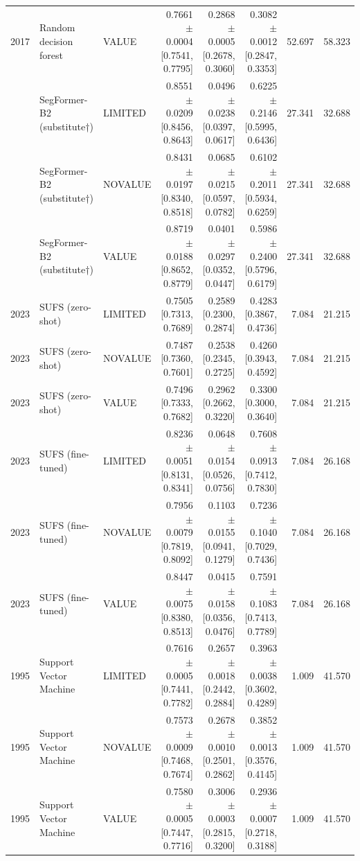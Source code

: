 \begin{table}[t]
\begin{tabular}{lllrrrrr}
2017 & Random decision forest & VALUE & 0.7661 $\pm$ 0.0004 [0.7541, 0.7795] & 0.2868 $\pm$ 0.0005 [0.2678, 0.3060] & 0.3082 $\pm$ 0.0012 [0.2847, 0.3353] & 52.697 & 58.323 \\
 & SegFormer-B2 (substitute†) & LIMITED & 0.8551 $\pm$ 0.0209 [0.8456, 0.8643] & 0.0496 $\pm$ 0.0238 [0.0397, 0.0617] & 0.6225 $\pm$ 0.2146 [0.5995, 0.6436] & 27.341 & 32.688 \\
 & SegFormer-B2 (substitute†) & NOVALUE & 0.8431 $\pm$ 0.0197 [0.8340, 0.8518] & 0.0685 $\pm$ 0.0215 [0.0597, 0.0782] & 0.6102 $\pm$ 0.2011 [0.5934, 0.6259] & 27.341 & 32.688 \\
 & SegFormer-B2 (substitute†) & VALUE & 0.8719 $\pm$ 0.0188 [0.8652, 0.8779] & 0.0401 $\pm$ 0.0297 [0.0352, 0.0447] & 0.5986 $\pm$ 0.2400 [0.5796, 0.6179] & 27.341 & 32.688 \\
2023 & SUFS (zero-shot) & LIMITED & 0.7505 [0.7313, 0.7689] & 0.2589 [0.2300, 0.2874] & 0.4283 [0.3867, 0.4736] & 7.084 & 21.215 \\
2023 & SUFS (zero-shot) & NOVALUE & 0.7487 [0.7360, 0.7601] & 0.2538 [0.2345, 0.2725] & 0.4260 [0.3943, 0.4592] & 7.084 & 21.215 \\
2023 & SUFS (zero-shot) & VALUE & 0.7496 [0.7333, 0.7682] & 0.2962 [0.2662, 0.3220] & 0.3300 [0.3000, 0.3640] & 7.084 & 21.215 \\
2023 & SUFS (fine-tuned) & LIMITED & 0.8236 $\pm$ 0.0051 [0.8131, 0.8341] & 0.0648 $\pm$ 0.0154 [0.0526, 0.0756] & 0.7608 $\pm$ 0.0913 [0.7412, 0.7830] & 7.084 & 26.168 \\
2023 & SUFS (fine-tuned) & NOVALUE & 0.7956 $\pm$ 0.0079 [0.7819, 0.8092] & 0.1103 $\pm$ 0.0155 [0.0941, 0.1279] & 0.7236 $\pm$ 0.1040 [0.7029, 0.7436] & 7.084 & 26.168 \\
2023 & SUFS (fine-tuned) & VALUE & 0.8447 $\pm$ 0.0075 [0.8380, 0.8513] & 0.0415 $\pm$ 0.0158 [0.0356, 0.0476] & 0.7591 $\pm$ 0.1083 [0.7413, 0.7789] & 7.084 & 26.168 \\
1995 & Support Vector Machine & LIMITED & 0.7616 $\pm$ 0.0005 [0.7441, 0.7782] & 0.2657 $\pm$ 0.0018 [0.2442, 0.2884] & 0.3963 $\pm$ 0.0038 [0.3602, 0.4289] & 1.009 & 41.570 \\
1995 & Support Vector Machine & NOVALUE & 0.7573 $\pm$ 0.0009 [0.7468, 0.7674] & 0.2678 $\pm$ 0.0010 [0.2501, 0.2862] & 0.3852 $\pm$ 0.0013 [0.3576, 0.4145] & 1.009 & 41.570 \\
1995 & Support Vector Machine & VALUE & 0.7580 $\pm$ 0.0005 [0.7447, 0.7716] & 0.3006 $\pm$ 0.0003 [0.2815, 0.3200] & 0.2936 $\pm$ 0.0007 [0.2718, 0.3188] & 1.009 & 41.570 \\

\end{tabular}
\end{table}
